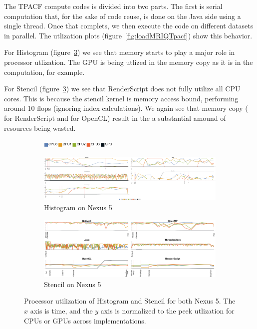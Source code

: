 The TPACF compute codes is divided into two parts.
The first is serial computation that, for the sake of code reuse, is done on the 
  Java side using a single thread.
Once that complets, we then execute the code on different datasets in parallel.
The utlization plots (figure~\ref{fig:loadMRIQTpacf}) show this behavior.  

For Histogram (figure~\ref{fig:loadHistogramStencil}) we see that memory starts
  to play a major role in processor utlization.
The GPU is being utlized in the memory copy as it is in the computation, for example.

For Stencil (figure~\ref{fig:loadHistogramStencil}) we see that RenderScript does
  not fully utilize all CPU cores.
This is because the stencil kernel is memory access bound, performing around 10 flops 
  (ignoring index calculations).
We again see that memory copy ( for RenderScript and
   for OpenCL) result in the a substantial amound of resources being
  wasted.

\begin{figure}[t]
  \centering

  \begin{subfigure}[b]{\textwidth}
          \centering
          \includegraphics[width=0.4\textwidth]{data/load_legend.pdf}
  \end{subfigure}

  \begin{subfigure}[b]{0.9\textwidth}
      \centering
      \includegraphics[width=\textwidth]{data/load_histogram_nexus5.pdf}
      \caption{Histogram on Nexus 5}
      \label{fig:Histogram5}
  \end{subfigure}
  \begin{subfigure}[b]{0.9\textwidth}
      \centering
      \includegraphics[width=\textwidth]{data/load_stencil_nexus5.pdf}
      \caption{Stencil on Nexus 5}
      \label{fig:Stencil5}
  \end{subfigure}

  \caption{Processor utilization of Histogram and Stencil for both Nexus 5. The $x$ axis is time, and the $y$ axis is normalized to the peek utlization for CPUs or GPUs across implementations.}
  \label{fig:loadHistogramStencil}
\end{figure}
\FloatBarrier

